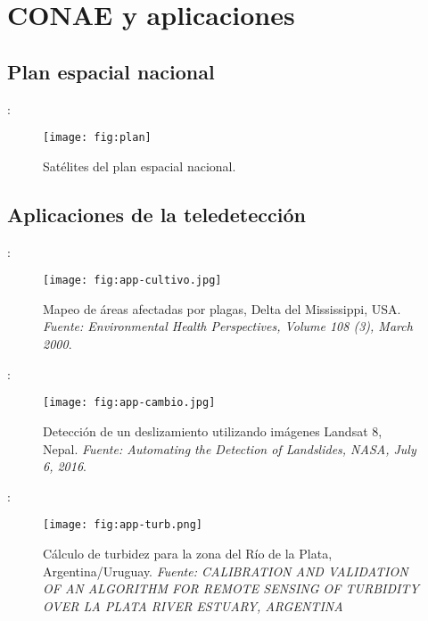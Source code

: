 \section{CONAE y aplicaciones}
\subsection{Plan espacial nacional}
\begin{frame}{\secname : \subsecname}
  \begin{figure}
    \centering
    \texttt{[image: fig:plan]}
    \caption{Satélites del plan espacial nacional.}
    \label{}
  \end{figure}
\end{frame}

\subsection{Aplicaciones de la teledetección}

\begin{frame}{\secname : \subsecname}
  \begin{figure}
    \centering
    \texttt{[image: fig:app-cultivo.jpg]}
    \caption{Mapeo de áreas afectadas por plagas, Delta del Mississippi, USA. \emph{Fuente: Environmental Health Perspectives, Volume 108 (3), March 2000}.}
    \label{}
  \end{figure}
\end{frame}

\begin{frame}{\secname : \subsecname}
  \begin{figure}
    \centering
    \texttt{[image: fig:app-cambio.jpg]}
    \caption{Detección de un deslizamiento utilizando imágenes Landsat 8, Nepal. \emph{Fuente: Automating the Detection of Landslides, NASA, July 6, 2016}.}
    \label{}
  \end{figure}
\end{frame}

\begin{frame}{\secname : \subsecname}
  \begin{figure}
    \centering
    \texttt{[image: fig:app-turb.png]}
    \caption{Cálculo de turbidez para la zona del Río de la Plata, Argentina/Uruguay. \emph{Fuente: CALIBRATION AND VALIDATION OF AN ALGORITHM FOR REMOTE SENSING OF TURBIDITY OVER LA PLATA RIVER ESTUARY, ARGENTINA}}
    \label{}
  \end{figure}
\end{frame}

